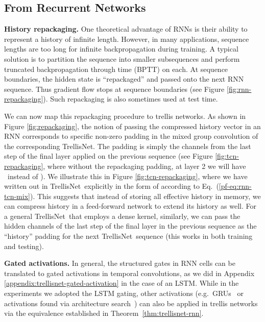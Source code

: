 \documentclass{article} \usepackage{iclr2019_conference,times}
\newcommand\mypara[1]{\vspace{0mm}\noindent\textbf{#1}}
\newcommand{\model}{TrellisNet}
\begin{document}
\subsection{From Recurrent Networks}
\label{appendix:from-rnns}

\mypara{History repackaging.}
One theoretical advantage of RNNs is their ability to represent a history of infinite length. However, in many applications, sequence lengths are too long for infinite backpropagation during training. A typical solution is to partition the sequence into smaller subsequences and perform truncated backpropagation through time (BPTT) on each. At sequence boundaries, the hidden state  is ``repackaged'' and passed onto the next RNN sequence. Thus gradient flow stops at sequence boundaries (see Figure \ref{fig:rnn-repackaging}). Such repackaging is also sometimes used at test time.

We can now map this repackaging procedure to trellis networks. As shown in Figure \ref{fig:repackaging}, the notion of passing the compressed history vector  in an RNN corresponds to specific non-zero padding in the mixed group convolution of the corresponding TrellisNet.
The padding is simply the channels from the last step of the final layer applied on the previous sequence (see Figure \ref{fig:tcn-repackaging}, where without the repackaging padding, at layer 2 we will have \small\normalsize~instead of \small\normalsize). We illustrate this in Figure \ref{fig:tcn-repackaging}, where we have written out  in \model~explicitly in the form of  according to Eq.~(\ref{pf-eq:rnn-tcn-mix}). This suggests that instead of storing all effective history in memory, we can compress history in a feed-forward network to extend its history as well. For a general \model~that employs a dense kernel, similarly, we can pass the hidden channels of the last step of the final layer in the previous sequence as the ``history'' padding for the next \model~sequence (this works in both training and testing).


\mypara{Gated activations.} In general, the structured gates in RNN cells can be translated to gated activations in temporal convolutions, as we did in Appendix \ref{appendix:trellisnet-gated-activation} in the case of an LSTM. While in the experiments we adopted the LSTM gating, other activations (e.g.\ GRUs~\citep{choGRU} or activations found via architecture search~\citep{zoph2017neural}) can also be applied in trellis networks via the equivalence established in Theorem~\ref{thm:trellisnet-rnn}.
\end{document}
